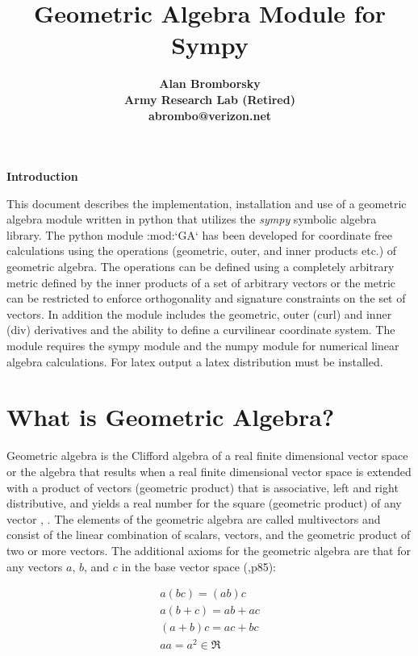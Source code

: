 \documentclass[10pt]{article}
\title{\bf\Large Geometric Algebra Module for Sympy}
\author{\bf Alan Bromborsky\\
\bf Army Research Lab (Retired)\\
\bf abrombo@verizon.net}
\newcommand{\lp}{\left (}
\newcommand{\rp}{\right )}
\begin{document}
\parskip 10pt

\maketitle
{\bf Introduction}\newline

   This document describes the implementation, installation and use of a
   geometric algebra module written in
   python that utilizes the \emph{sympy} symbolic algebra library.  The python
   module :mod:`GA` has been developed for coordinate free calculations using
   the operations (geometric, outer, and inner products etc.) of geometric algebra.
   The operations can be defined using a completely arbitrary metric defined
   by the inner products of a set of arbitrary vectors or the metric can be
   restricted to enforce orthogonality and signature constraints on the set of
   vectors.  In addition the module includes the geometric, outer (curl) and inner
   (div) derivatives and the ability to define a curvilinear coordinate system.
   The module requires the sympy module and the numpy module for numerical linear
   algebra calculations.  For latex output a latex distribution must be installed.

\tableofcontents

\section{What is Geometric Algebra?}

Geometric algebra is the Clifford algebra of a real finite dimensional vector
space or the algebra that results when a real finite dimensional vector space
is extended with a product of vectors (geometric product) that is associative,
left and right distributive, and yields a real number for the square (geometric
product) of any vector \cite{Hestenes}, \cite{Doran}.  The elements of the geometric
algebra are called multivectors and consist of the linear combination of
scalars, vectors, and the geometric product of two or more vectors. The
additional axioms for the geometric algebra are that for any vectors $a$,
$b$, and $c$ in the base vector space (\cite{Doran},p85):

  \begin{equation}
  \begin{array}{c}
  a\lp bc \rp = \lp ab \rp c \\
  a\lp b+c \rp = ab+ac \\
  \lp a + b \rp c = ac+bc \\
  aa = a^{2} \in \Re
  \end{array}
  \end{equation}
\end{document}
